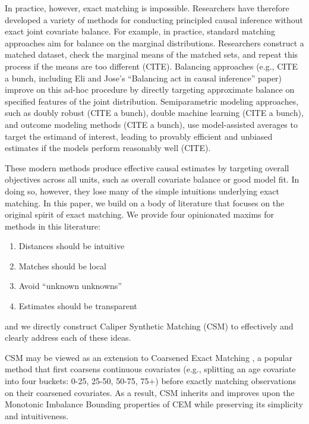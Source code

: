\documentclass{article}
\begin{document}
In practice, however, exact matching is impossible.
Researchers have therefore developed a variety of methods for conducting principled causal inference without exact joint covariate balance.
For example, in practice, standard matching approaches aim for balance on the marginal distributions.
Researchers construct a matched dataset, check the marginal means of the matched sets, and repeat this process if the means are too different (CITE).
Balancing approaches (e.g., CITE a bunch, including Eli and Jose's ``Balancing act in causal inference'' paper) improve on this ad-hoc procedure by directly targeting approximate balance on specified features of the joint distribution.
Semiparametric modeling approaches, such as doubly robust (CITE a bunch), double machine learning (CITE a bunch), and outcome modeling methods (CITE a bunch), use model-assisted averages to target the estimand of interest, leading to provably efficient and unbiased estimates if the models perform reasonably well (CITE).

These modern methods produce effective causal estimates by targeting overall objectives across all units, such as overall covariate balance or good model fit.
In doing so, however, they lose many of the simple intuitions underlying exact matching.
In this paper, we build on a body of literature that focuses on the original spirit of exact matching.
We provide four opinionated maxims for methods in this literature: 
\begin{enumerate}[itemsep=0pt, topsep=12pt, partopsep=0pt]
    \item Distances should be intuitive
    \item Matches should be local
    \item Avoid ``unknown unknowns''
    \item Estimates should be transparent
\end{enumerate}
and we directly construct Caliper Synthetic Matching (CSM) to effectively and clearly address each of these ideas.

CSM may be viewed as an extension to Coarsened Exact Matching \citep[CEM; ][]{iacus2012causal}, a popular method that first coarsens continuous covariates (e.g., splitting an age covariate into four buckets: 0-25, 25-50, 50-75, 75+) before exactly matching observations on their coarsened covariates.
As a result, CSM inherits and improves upon the Monotonic Imbalance Bounding \citep[MIB; ][]{iacus2011multivariate} properties of CEM while preserving its simplicity and intuitiveness.
\end{document}
